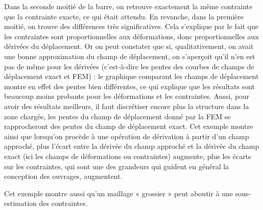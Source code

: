 \documentclass[11pt,a4paper]{report}
\begin{document}
{Dans la seconde moitié de la barre, on retrouve exactement la même contrainte que la contrainte exacte, ce qui était attendu. En revanche, dans la première moitié, on trouve des différences très significatives. Cela s'explique par le fait que les contraintes sont proportionnelles aux déformations, donc proportionnelles aux dérivées du déplacement. Or on peut constater que si, qualitativement, on avait une bonne approximation du champ de déplacement, on s'aperçoit qu'il n'en est pas de même pour les dérivées (c'est-à-dire les pentes des courbes de champs de déplacement exact et FEM) : le graphique comparant les champs de déplacement montre en effet des pentes bien différentes, ce qui explique que les résultats sont beaucoup moins probants pour les déformations et les contraintes. Aussi, pour avoir des résultats meilleurs, il faut discrétiser encore plus la structure dans la zone chargée, les pentes du champ de déplacement donné par la FEM se rapprocheront des pentes du champ de déplacement exact. Cet exemple montre ainsi que lorsqu'on procède à une opération de dérivation à partir d'un champ approché, plus l'écart entre la dérivée du champ approché et la dérivée du champ exact (ici les champs de déformations ou contraintes) augmente, plus les écarts sur les contraintes, qui sont une des grandeurs qui guident en général la conception des ouvrages, augmentent.

Cet exemple montre aussi qu'un maillage « grossier » peut aboutir à une sous-estimation des contraintes.
}
\end{document}
